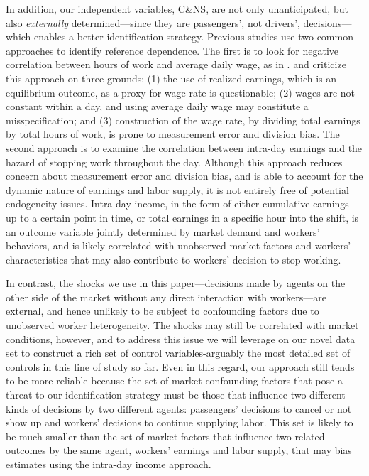 \documentclass[reviewmode]{restud}
\begin{document}
In addition, our independent variables, C\&NS, are not only unanticipated, but also \textit{externally} determined---since they are passengers', not drivers', decisions---which enables a better identification strategy. Previous studies use two common approaches to identify reference dependence. The first is to look for negative correlation between hours of work and average daily wage, as in \citet{camerer1997labor}. \citet{oettinger1999empirical} and \citet{farber2005tomorrow}  criticize this approach on three grounds: (1) the use of realized earnings, which is an equilibrium outcome, as a proxy for wage rate is questionable; (2) wages are not constant within a day, and using average daily wage may constitute a misspecification; and (3) construction of the wage rate, by dividing total earnings by total hours of work, is prone to measurement error and division bias. The second approach is to examine the correlation between intra-day earnings and the hazard of stopping work throughout the day. Although this approach reduces concern about measurement error and division bias, and is able to account for the dynamic nature of earnings and labor supply, it is not entirely free of potential endogeneity issues. Intra-day income, in the form of either cumulative earnings up to a certain point in time, or total earnings in a specific hour into the shift, is an outcome variable jointly determined by market demand and workers' behaviors, and is likely correlated with unobserved market factors and workers' characteristics that may also contribute to workers' decision to stop working. 

In contrast, the shocks we use in this paper---decisions made by agents on the other side of the market without any direct interaction with workers---are external, and hence unlikely to be subject to confounding factors due to unobserved worker heterogeneity. The shocks may still be correlated with market conditions, however, and to address this issue we will leverage on our novel data set to construct a rich set of control variables-arguably the most detailed set of controls in this line of study so far. Even in this regard, our approach still tends to be more reliable because the set of market-confounding factors that pose a threat to our identification strategy must be those that influence two different kinds of decisions by two different agents: passengers' decisions to cancel or not show up and workers' decisions to continue supplying labor. This set is likely to be much smaller than the set of market factors that influence two related outcomes by the same agent, workers' earnings and labor supply, that may bias estimates using the intra-day income approach.
\end{document}
